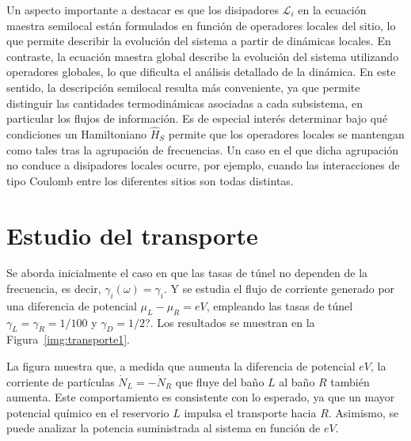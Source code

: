Un aspecto importante a destacar es que los disipadores $\mathcal{L}_i$ en la ecuación maestra semilocal están formulados en función de operadores locales del sitio, lo que permite describir la evolución del sistema a partir de dinámicas locales. En contraste, la ecuación maestra global describe la evolución del sistema utilizando operadores globales, lo que dificulta el análisis detallado de la dinámica. En este sentido, la descripción semilocal resulta más conveniente, ya que permite distinguir las cantidades termodinámicas asociadas a cada subsistema, en particular los flujos de información. Es de especial interés determinar bajo qué condiciones un Hamiltoniano $\hat{H}_S$ permite que los operadores locales se mantengan como tales tras la agrupación de frecuencias. Un caso en el que dicha agrupación no conduce a disipadores locales ocurre, por ejemplo, cuando las interacciones de tipo Coulomb entre los diferentes sitios son todas distintas.

\label{sec5:modelo}

\newpage

\section{Estudio del transporte}
Se aborda inicialmente el caso en que las tasas de túnel no dependen de la frecuencia, es decir, $\gamma_{i}(\omega) = \gamma_{i}$. Y se estudia el flujo de corriente generado por una diferencia de potencial $\mu_{L} - \mu_{R} = eV$, empleando las tasas de túnel $\gamma_{L} = \gamma_{R} = 1/100$ y $\gamma_{D} = 1/2$?. Los resultados se muestran en la Figura~\ref{img:transporte1}.


La figura muestra que, a medida que aumenta la diferencia de potencial \( eV \), la corriente de partículas \( \dot{N}_L = -\dot{N}_R \) que fluye del baño \( L \) al baño \( R \) también aumenta. Este comportamiento es consistente con lo esperado, ya que un mayor potencial químico en el reservorio \( L \) impulsa el transporte hacia \( R \). Asimismo, se puede analizar la potencia suministrada al sistema en función de \( eV \).

